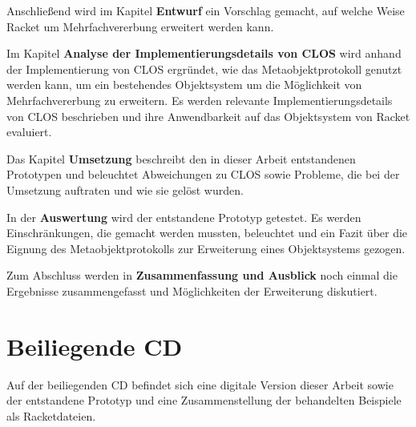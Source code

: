 Anschließend wird im Kapitel \textbf{Entwurf} ein Vorschlag gemacht, auf welche Weise Racket um Mehrfachvererbung erweitert werden kann. 

Im Kapitel \textbf{Analyse der Implementierungsdetails von CLOS} wird anhand der Implementierung von CLOS ergründet, wie das Metaobjektprotokoll genutzt werden kann, um ein bestehendes Objektsystem um die Möglichkeit von Mehrfachvererbung zu erweitern. Es werden relevante Implementierungsdetails von CLOS beschrieben und ihre Anwendbarkeit auf das Objektsystem von Racket evaluiert.

Das Kapitel \textbf{Umsetzung} beschreibt den in dieser Arbeit entstandenen Prototypen und beleuchtet Abweichungen zu CLOS sowie Probleme, die bei der Umsetzung auftraten und wie sie gelöst wurden.

In der \textbf{Auswertung} wird der entstandene Prototyp getestet. Es werden Einschränkungen, die gemacht werden mussten, beleuchtet und ein Fazit über die Eignung des Metaobjektprotokolls zur Erweiterung eines Objektsystems gezogen.

Zum Abschluss werden in \textbf{Zusammenfassung und Ausblick} noch einmal die Ergebnisse zusammengefasst und Möglichkeiten der Erweiterung diskutiert.

\section{Beiliegende CD}
Auf der beiliegenden CD befindet sich eine digitale Version dieser Arbeit sowie der entstandene Prototyp und eine Zusammenstellung der behandelten Beispiele als Racketdateien.

